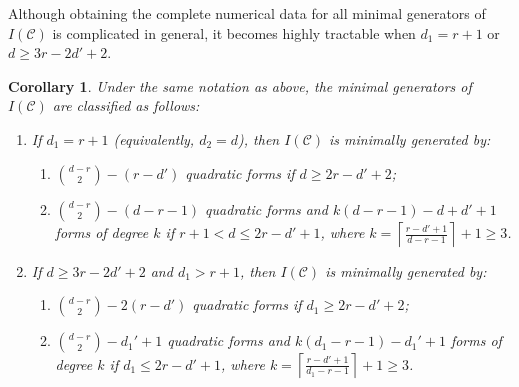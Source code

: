 \documentclass[a4paper, 11pt]{amsart}
\numberwithin{theorem}{section}
\newtheorem{corollary}[theorem]{Corollary}
\theoremstyle{definition}
\numberwithin{equation}{section}
\begin{document}
Although obtaining the complete numerical data for all minimal generators of $I(\mathcal{C})$ is complicated in general, it becomes highly tractable when $d_1 = r+1$ or $d \geq 3r-2d'+2$.
\begin{corollary}\label{cor:classification}
Under the same notation as above, the minimal generators of $I(\mathcal{C})$ are classified as follows:
\begin{enumerate}
    \item\label{cor:case1} If $d_1 = r+1$ (equivalently, $d_2=d$), then $I(\mathcal{C})$ is minimally generated by:
    \begin{enumerate}
        \item\label{cor:case1-1} $\binom{d-r}{2}-(r-d')$ quadratic forms if $d \ge 2r-d'+2$;
        \item\label{cor:case1-2} $\binom{d-r}{2}-(d-r-1)$ quadratic forms and $k(d-r-1)-d+d'+1$ forms of degree $k$ if $r+1 < d \leq 2r-d'+1$, where $k = \left\lceil \frac{r-d'+1}{d-r-1} \right\rceil+1 \ge 3$.
    \end{enumerate}

    \item\label{cor:case2} If $d \ge 3r-2d'+2$ and $d_1 > r+1$, then $I(\mathcal{C})$ is minimally generated by:
    \begin{enumerate}
        \item\label{cor:case2-1} $\binom{d-r}{2} - 2(r-d')$ quadratic forms if $d_1 \ge 2r-d'+2$;
        \item\label{cor:case2-2} $\binom{d-r}{2} - d_1' + 1$ quadratic forms and $k(d_1-r-1)-d_1'+1$ forms of degree $k$ if $d_1 \leq 2r-d'+1$, where $k = \left\lceil \frac{r-d'+1}{d_1-r-1} \right\rceil+1 \ge 3$.
    \end{enumerate}
\end{enumerate}
\end{corollary}
\end{document}
